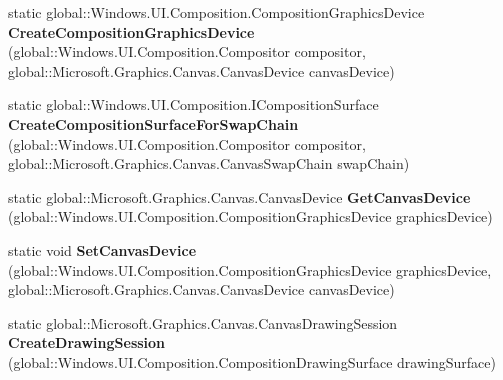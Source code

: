 \begin{DoxyCompactItemize}
static global\+::\+Windows.\+U\+I.\+Composition.\+Composition\+Graphics\+Device {\bfseries Create\+Composition\+Graphics\+Device} (global\+::\+Windows.\+U\+I.\+Composition.\+Compositor compositor, global\+::\+Microsoft.\+Graphics.\+Canvas.\+Canvas\+Device canvas\+Device)
\item 
\mbox{\label{class_microsoft_1_1_graphics_1_1_canvas_1_1_u_i_1_1_composition_1_1_canvas_composition_a5b9957a9a95828b0fb6d0e5cacbaa376}} 
static global\+::\+Windows.\+U\+I.\+Composition.\+I\+Composition\+Surface {\bfseries Create\+Composition\+Surface\+For\+Swap\+Chain} (global\+::\+Windows.\+U\+I.\+Composition.\+Compositor compositor, global\+::\+Microsoft.\+Graphics.\+Canvas.\+Canvas\+Swap\+Chain swap\+Chain)
\item 
\mbox{\label{class_microsoft_1_1_graphics_1_1_canvas_1_1_u_i_1_1_composition_1_1_canvas_composition_a3b6e31d08196ba66744cad30ed1a1e1c}} 
static global\+::\+Microsoft.\+Graphics.\+Canvas.\+Canvas\+Device {\bfseries Get\+Canvas\+Device} (global\+::\+Windows.\+U\+I.\+Composition.\+Composition\+Graphics\+Device graphics\+Device)
\item 
\mbox{\label{class_microsoft_1_1_graphics_1_1_canvas_1_1_u_i_1_1_composition_1_1_canvas_composition_a80598aedf841c5ed7457b3b96fd2b114}} 
static void {\bfseries Set\+Canvas\+Device} (global\+::\+Windows.\+U\+I.\+Composition.\+Composition\+Graphics\+Device graphics\+Device, global\+::\+Microsoft.\+Graphics.\+Canvas.\+Canvas\+Device canvas\+Device)
\item 
\mbox{\label{class_microsoft_1_1_graphics_1_1_canvas_1_1_u_i_1_1_composition_1_1_canvas_composition_a1f8acd780668173cb52fdc3fcbcdc428}} 
static global\+::\+Microsoft.\+Graphics.\+Canvas.\+Canvas\+Drawing\+Session {\bfseries Create\+Drawing\+Session} (global\+::\+Windows.\+U\+I.\+Composition.\+Composition\+Drawing\+Surface drawing\+Surface)
\item 
\mbox{\label{class_microsoft_1_1_graphics_1_1_canvas_1_1_u_i_1_1_composition_1_1_canvas_composition_a55e464bf5949c3a7f758e8313be5e37a}} 

\end{DoxyCompactItemize}
